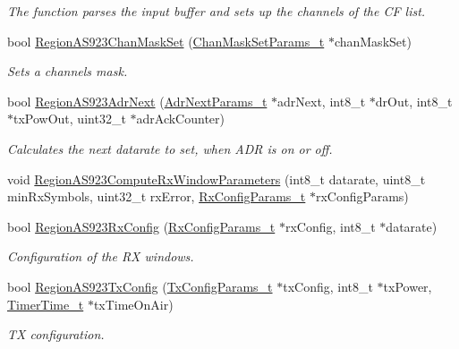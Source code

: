 \begin{DoxyCompactItemize}
\begin{DoxyCompactList}\small\item\em The function parses the input buffer and sets up the channels of the CF list. \end{DoxyCompactList}\item 
bool \hyperlink{group__REGIONAS923_gab493d29d1037f6b6f47baf0cfc2faf47}{Region\+A\+S923\+Chan\+Mask\+Set} (\hyperlink{group__REGION_ga6d24f7da136006410827dfb29f6b9b9e}{Chan\+Mask\+Set\+Params\+\_\+t} $\ast$chan\+Mask\+Set)
\begin{DoxyCompactList}\small\item\em Sets a channels mask. \end{DoxyCompactList}\item 
bool \hyperlink{group__REGIONAS923_ga38146f12b31fadadda54344d9f5d7e49}{Region\+A\+S923\+Adr\+Next} (\hyperlink{group__REGION_ga567c2742622326b350b4e91bbf61b4ce}{Adr\+Next\+Params\+\_\+t} $\ast$adr\+Next, int8\+\_\+t $\ast$dr\+Out, int8\+\_\+t $\ast$tx\+Pow\+Out, uint32\+\_\+t $\ast$adr\+Ack\+Counter)
\begin{DoxyCompactList}\small\item\em Calculates the next datarate to set, when A\+DR is on or off. \end{DoxyCompactList}\item 
void \hyperlink{group__REGIONAS923_ga33875aeda67698b7be396f9ef9b1d081}{Region\+A\+S923\+Compute\+Rx\+Window\+Parameters} (int8\+\_\+t datarate, uint8\+\_\+t min\+Rx\+Symbols, uint32\+\_\+t rx\+Error, \hyperlink{group__REGION_ga375c038078dfcfc7ef14280021db719e}{Rx\+Config\+Params\+\_\+t} $\ast$rx\+Config\+Params)
\item 
bool \hyperlink{group__REGIONAS923_ga236a04c03ccf327e5a3d1a0130e19e10}{Region\+A\+S923\+Rx\+Config} (\hyperlink{group__REGION_ga375c038078dfcfc7ef14280021db719e}{Rx\+Config\+Params\+\_\+t} $\ast$rx\+Config, int8\+\_\+t $\ast$datarate)
\begin{DoxyCompactList}\small\item\em Configuration of the RX windows. \end{DoxyCompactList}\item 
bool \hyperlink{group__REGIONAS923_gab4e1c5c1e67df4682b90950164afec03}{Region\+A\+S923\+Tx\+Config} (\hyperlink{group__REGION_gabed730d4d04b0b60d4b6d1966d3f21d3}{Tx\+Config\+Params\+\_\+t} $\ast$tx\+Config, int8\+\_\+t $\ast$tx\+Power, \hyperlink{utilities_8h_a4215ca43d3e953099ea758ce428599d0}{Timer\+Time\+\_\+t} $\ast$tx\+Time\+On\+Air)
\begin{DoxyCompactList}\small\item\em TX configuration. \end{DoxyCompactList}\item 

\end{DoxyCompactItemize}
